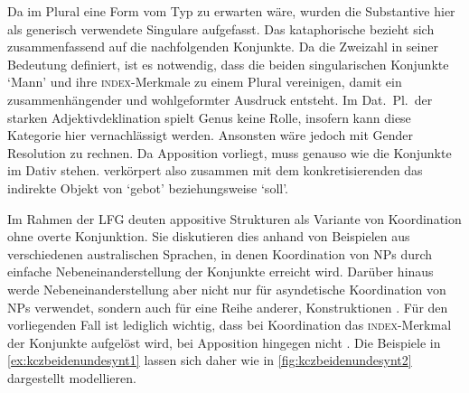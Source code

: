 Da im Plural eine Form vom Typ  zu erwarten wäre, wurden die
Substantive hier als generisch verwendete Singulare aufgefasst. Das
kataphorische  bezieht sich zusammenfassend auf die nachfolgenden
Konjunkte. Da  die Zweizahl in seiner Bedeutung definiert, ist es
notwendig, dass die beiden singularischen Konjunkte  `Mann' und
 ihre \textsc{index}-Merkmale zu einem Plural vereinigen, damit ein
zusammenhängender und wohlgeformter Ausdruck entsteht. Im Dat.~Pl.\ der starken
Adjektivdeklination spielt Genus keine Rolle, insofern kann diese Kategorie
hier vernachlässigt werden. Ansonsten wäre jedoch mit Gender Resolution zu
rechnen. Da Apposition vorliegt, muss  genauso wie die Konjunkte im
Dativ stehen.  verkörpert also zusammen mit dem konkretisierenden
 das indirekte Objekt von  `gebot'
beziehungsweise  `soll'.

Im Rahmen der LFG deuten \citet{sadlernordlinger2006} appositive Strukturen als
Variante von Koordination ohne overte Konjunktion. Sie diskutieren dies anhand
von Beispielen aus verschiedenen australischen Sprachen, in denen Koordination
von NPs durch einfache Nebeneinanderstellung der Konjunkte erreicht wird.
Darüber hinaus werde Nebeneinanderstellung aber nicht nur für asyndetische
Koordination von NPs verwendet, sondern auch für eine Reihe anderer,
 Konstruktionen
\autocite[440--441]{sadlernordlinger2006}. Für den vorliegenden Fall ist
lediglich wichtig, dass bei Koordination das \textsc{index}-Merkmal der
Konjunkte aufgelöst wird, bei Apposition hingegen nicht
\autocite[444]{sadlernordlinger2006}. Die Beispiele in
\cref{ex:kczbeidenundesynt1} lassen sich daher wie in
\cref{fig:kczbeidenundesynt2} dargestellt modellieren.

